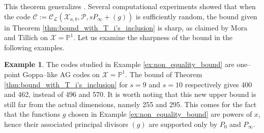 \documentclass[lettersize,journal]{IEEEtran}
\theoremstyle{plain}
\theoremstyle{definition}
\newtheorem{example}[thm]{Example}
\theoremstyle{remark}
\newcommand{\calP}{\mathcal{P}}
\newcommand{\calL}{\mathcal{L}}
\newcommand{\calC}{\mathcal{C}}
\newcommand{\calX}{\mathcal{X}}
\newcommand{\PP}{\mathbb{P}}
\begin{document}
	This theorem generalizes \cite[Corollary 27]{MT21}. Several computational experiments showed that when the code $\calC:=\calC_{\calL}(\calX_{a,b},\calP,sP_\infty+(g))$ is sufficiently random, the bound given in Theorem \ref{thm:bound_with_T_i's_inclusion} is sharp, as claimed by Mora and Tillich \cite[Remark 28]{MT21} on ${\calX=\PP^1}$. Let us examine the sharpness of the bound in the following examples.
	
	\begin{example}\label{ex:comp}
		The codes studied in Example \ref{ex:non_equality_bound} are one--point Goppa--like AG codes on ${\calX=\PP^1}$. The bound of Theorem \ref{thm:bound_with_T_i's_inclusion} for $s=9$ and $s=10$ respectively gives 400 and 462, instead of 496 and 570. It is worth noting that this new upper bound is still far from the actual dimensions, namely 255 and 295. This comes for the fact that the functions $g$ chosen in Example \ref{ex:non_equality_bound} are powers of $x$, hence their associated principal divisors $(g)$ are supported only by $P_0$ and $P_\infty$.
	\end{example}
	
\end{document}
